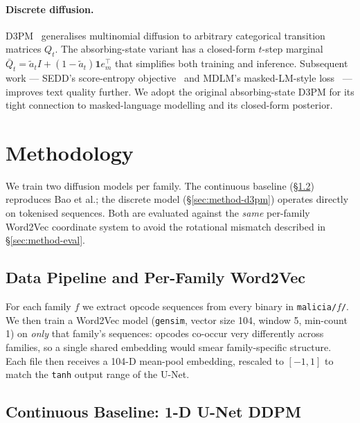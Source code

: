 \documentclass[runningheads]{llncs}
\newcommand{\code}[1]{\texttt{#1}}
\begin{document}
\paragraph{Discrete diffusion.}
D3PM~\cite{austin2021d3pm} generalises multinomial diffusion to arbitrary
categorical transition matrices $Q_t$. The absorbing-state variant has a
closed-form $t$-step marginal $\bar{Q}_t = \tilde{a}_t I + (1-\tilde{a}_t)\mathbf{1}e_m^\top$
that simplifies both training and inference. Subsequent work --- SEDD's
score-entropy objective~\cite{lou2024sedd} and MDLM's masked-LM-style
loss~\cite{sahoo2024mdlm} --- improves text quality further. We adopt the
original absorbing-state D3PM for its tight connection to masked-language
modelling and its closed-form posterior.

\section{Methodology}
\label{sec:method}

We train two diffusion models per family. The continuous baseline
(\S\ref{sec:method-ddpm}) reproduces Bao et al.; the discrete model
(\S\ref{sec:method-d3pm}) operates directly on tokenised sequences.
Both are evaluated against the \emph{same} per-family Word2Vec coordinate
system to avoid the rotational mismatch described in \S\ref{sec:method-eval}.

\subsection{Data Pipeline and Per-Family Word2Vec}

For each family $f$ we extract opcode sequences from every binary in
\code{malicia/$f$/}. We then train a Word2Vec model (\code{gensim}, vector
size 104, window 5, min-count 1) on \emph{only} that family's sequences:
opcodes co-occur very differently across families, so a single shared
embedding would smear family-specific structure. Each file then receives a
104-D mean-pool embedding, rescaled to $[-1,1]$ to match the \code{tanh}
output range of the U-Net.

\subsection{Continuous Baseline: 1-D U-Net DDPM}
\label{sec:method-ddpm}
\end{document}
